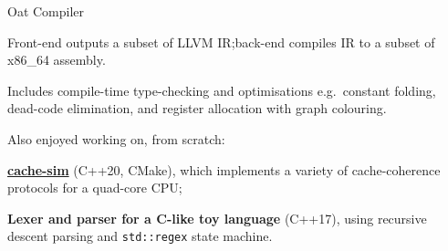 \begin{cventries}
	{Oat Compiler} %
	{} %
	{} %
	{
		\begin{cvitems} %
			\item Front-end outputs a subset of LLVM IR;\@ back-end compiles IR to a subset of x86\_64 assembly.
			\item Includes compile-time type-checking and optimisations e.g.\ constant folding, dead-code elimination, and register allocation with graph colouring.
		\end{cvitems}
	}

	\cventry{} %
	{Also enjoyed working on, from scratch:} %
	{} %
	{} %
	{
		\vspace{-4mm}
		\begin{cvitems}
		\item \textbf{\href{https://github.com/sharadhr/cs4223-cache-sim}{cache-sim}} (C++20, CMake), which implements a variety of cache-coherence protocols for a quad-core CPU;
		\item \textbf{Lexer and parser for a C-like toy language} (C++17), using recursive descent parsing and \texttt{std::regex} state machine.
	\end{cvitems}
	}
\end{cventries}





